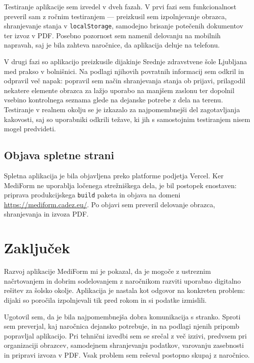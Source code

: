 \documentclass[12pt,a4paper]{article}
\begin{document}
Testiranje aplikacije sem izvedel v dveh fazah. V prvi fazi sem funkcionalnost
preveril sam z ro\v{c}nim testiranjem --- preizkusil sem izpolnjevanje obrazca,
shranjevanje stanja v \texttt{localStorage}, samodejno brisanje pote\v{c}enih
dokumentov ter izvoz v PDF. Posebno pozornost sem namenil delovanju na mobilnih
napravah, saj je bila zahteva naro\v{c}nice, da aplikacija deluje na telefonu.

V drugi fazi so aplikacijo preizkusile dijakinje Srednje zdravstvene \v{s}ole
Ljubljana med prakso v bolnišnici. Na podlagi njihovih povratnih informacij
sem odkril in odpravil ve\v{c} napak: popravil sem na\v{c}in shranjevanja stanja
ob prijavi, prilagodil nekatere elemente obrazca za la\v{z}jo uporabo na
manj\v{s}em zaslonu ter dopolnil vsebino kontrolnega seznama glede na dejanske
potrebe z dela na terenu. Testiranje v realnem okolju se je izkazalo za
najpomembnej\v{s}i del zagotavljanja kakovosti, saj so uporabniki odkrili
te\v{z}ave, ki jih s samostojnim testiranjem nisem mogel predvideti.

\subsection{Objava spletne strani}

Spletna aplikacija je bila objavljena preko platforme podjetja Vercel. Ker MediForm ne uporablja lo\v{c}enega stre\v{z}ni\v{s}kega dela, je bil postopek enostaven: priprava produkcijskega \texttt{build} paketa in objava na domeni \url{https://mediform.cadez.eu/}. Po objavi sem preveril delovanje obrazca, shranjevanja in izvoza PDF.

\section{Zaklju\v{c}ek}

Razvoj aplikacije MediForm mi je pokazal, da je mogo\v{c}e z ustreznim na\v{c}rtovanjem in dobrim sodelovanjem z naro\v{c}nikom razviti uporabno digitalno re\v{s}itev za \v{s}olsko okolje. Aplikacija je nastala kot odgovor na konkreten problem: dijaki so poro\v{c}ila izpolnjevali tik pred rokom in si podatke izmislili.

Ugotovil sem, da je bila najpomembnej\v{s}a dobra komunikacija s stranko. Sproti sem preverjal, kaj naro\v{c}nica dejansko potrebuje, in na podlagi njenih pripomb popravljal aplikacijo. Pri tehni\v{c}ni izvedbi sem se sre\v{c}al z ve\v{c} izzivi, predvsem pri organizaciji obrazcev, samodejnem shranjevanju podatkov, varovanju zasebnosti in pripravi izvoza v PDF. Vsak problem sem re\v{s}eval postopno skupaj z naro\v{c}nico.
\end{document}
